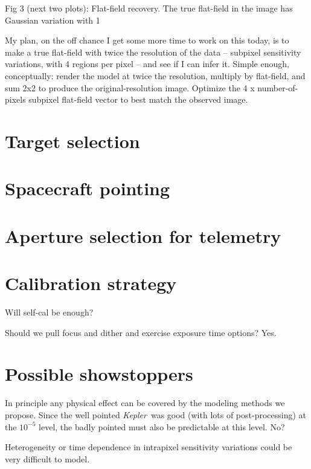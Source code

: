 \documentclass[letterpaper,12pt,preprint]{aastex}
\newcommand{\observatory}[1]{\textsl{#1}}
\newcommand{\Kepler}{\observatory{Kepler}}
\begin{document}
Fig 3 (next two plots): Flat-field recovery.  The true flat-field in the image has Gaussian variation with 1%

My plan, on the off chance I get some more time to work on this today, is to make a true flat-field with twice the resolution of the data -- subpixel sensitivity variations, with 4 regions per pixel -- and see if I can infer it. Simple enough, conceptually: render the model at twice the resolution, multiply by flat-field, and sum 2x2 to produce the original-resolution image.  Optimize the 4 x number-of-pixels subpixel flat-field vector to best match the observed image.

\section{Target selection}\label{sec:target}

\section{Spacecraft pointing}\label{sec:pointing}

\section{Aperture selection for telemetry}\label{sec:telemetry}

\section{Calibration strategy}\label{sec:calibration}

Will self-cal be enough?

Should we pull focus and dither and exercise exposure time options?  Yes.

\section{Possible showstoppers}\label{sec:stop}

In principle any physical effect can be covered by the modeling
  methods we propose.
Since the well pointed \Kepler\ was good (with lots of post-processing)
  at the $10^{-5}$ level,
  the badly pointed must also be predictable at this level.  No?

Heterogeneity or time dependence in intrapixel sensitivity variations
could be very difficult to model.
\end{document}
